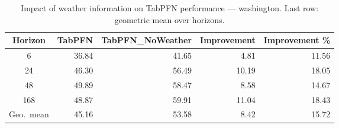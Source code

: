 \begin{table}
\centering
\caption{Impact of weather information on TabPFN performance — washington. Last row: geometric mean over horizons.}
\label{tab:tabpfn_weather_washington}
\begin{tabular}{crrrr}
\toprule
Horizon & TabPFN & TabPFN\_NoWeather & Improvement & Improvement \% \\
\midrule
6 & 36.84 & 41.65 & 4.81 & 11.56 \\
24 & 46.30 & 56.49 & 10.19 & 18.05 \\
48 & 49.89 & 58.47 & 8.58 & 14.67 \\
168 & 48.87 & 59.91 & 11.04 & 18.43 \\
\midrule
Geo.\ mean & 45.16 & 53.58 & 8.42 & 15.72 \\
\bottomrule
\end{tabular}
\end{table}
